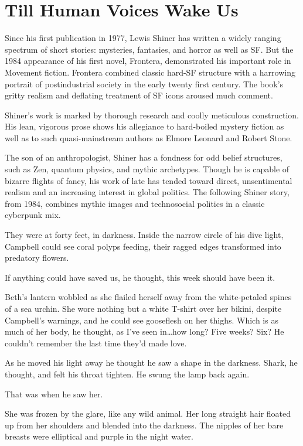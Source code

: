 \chapter*{Till Human Voices Wake Us}

Since his first publication in 1977, Lewis Shiner has written a widely ranging spectrum of short stories: mysteries, fantasies, and horror as well as SF. But the 1984 appearance of his first novel, Frontera, demonstrated his important role in Movement fiction. Frontera combined classic hard-SF structure with a harrowing portrait of postindustrial society in the early twenty first century. The book's gritty realism and deflating treatment of SF icons aroused much comment.

Shiner's work is marked by thorough research and coolly meticulous construction. His lean, vigorous prose shows his allegiance to hard-boiled mystery fiction as well as to such quasi-mainstream authors as Elmore Leonard and Robert Stone.

The son of an anthropologist, Shiner has a fondness for odd belief structures, such as Zen, quantum physics, and mythic archetypes. Though he is capable of bizarre flights of fancy, his work of late has tended toward direct, unsentimental realism and an increasing interest in global politics. The following Shiner story, from 1984, combines mythic images and technosocial politics in a classic cyberpunk mix.

\hrulefill

They were at forty feet, in darkness. Inside the narrow circle of his dive light, Campbell could see coral polyps feeding, their ragged edges transformed into predatory flowers.

If anything could have saved us, he thought, this week should have been it.

Beth's lantern wobbled as she flailed herself away from the white-petaled spines of a sea urchin. She wore nothing but a white T-shirt over her bikini, despite Campbell's warnings, and he could see gooseflesh on her thighs. Which is as much of her body, he thought, as I've seen in\ldots how long? Five weeks? Six? He couldn't remember the last time they'd made love.

As he moved his light away he thought he saw a shape in the darkness. Shark, he thought, and felt his throat tighten. He swung the lamp back again.

That was when he saw her.

She was frozen by the glare, like any wild animal. Her long straight hair floated up from her shoulders and blended into the darkness. The nipples of her bare breasts were elliptical and purple in the night water.

